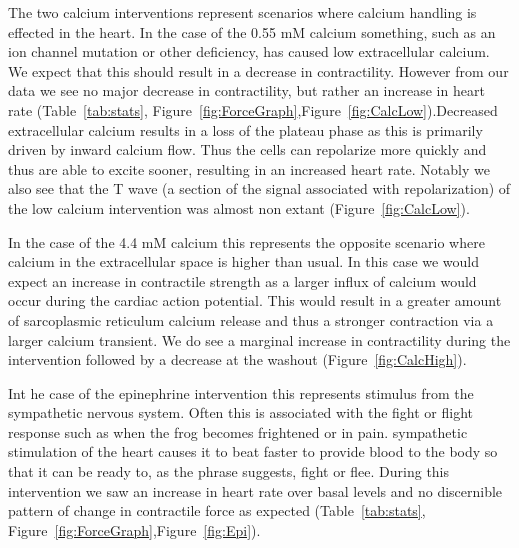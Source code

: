 \documentclass[12pt]{article}
\begin{document}
\par{}
The two calcium interventions represent scenarios where calcium handling is effected in the heart. In the case of the 0.55 mM calcium something, such as an ion channel mutation or other deficiency, has caused low extracellular calcium. We expect that this should  result in a decrease in contractility. However from our data we see no major decrease in contractility, but rather an increase in heart rate (Table~\ref{tab:stats}, Figure~\ref{fig:ForceGraph},Figure~\ref{fig:CalcLow}).Decreased extracellular calcium results in a loss of the plateau phase as this is primarily driven by inward calcium flow. Thus the cells can repolarize more quickly and thus are able to excite sooner, resulting in an increased heart rate. Notably we also see that the T wave (a section of the signal associated with repolarization) of the low calcium intervention was almost non extant (Figure~\ref{fig:CalcLow}).
\par{}
In the case of the 4.4 mM calcium this represents the opposite scenario where calcium in the extracellular space is higher than usual. In this case we would expect an increase in contractile strength as a larger influx of calcium would occur during the cardiac action potential. This would result in a greater amount of sarcoplasmic reticulum calcium release and thus a stronger contraction via a larger calcium transient. We do see a marginal increase in contractility during the intervention followed by a decrease at the washout (Figure~\ref{fig:CalcHigh}).
\par{}
Int he case of the epinephrine intervention this represents  stimulus from the sympathetic nervous system. Often this is associated with the fight or flight response such as when the frog becomes frightened or in pain. sympathetic stimulation of the heart causes it to beat faster to provide blood to the body so that it can be ready to, as the phrase suggests, fight or flee. During this intervention we saw an increase in heart rate over basal levels and no discernible pattern of change in contractile force as expected (Table~\ref{tab:stats}, Figure~\ref{fig:ForceGraph},Figure~\ref{fig:Epi}).
\end{document}
